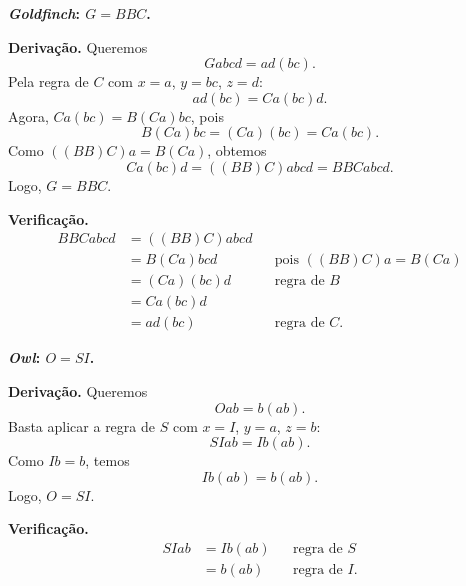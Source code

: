 \begin{solution}
\begin{Qlist}
\item[(c)] \textbf{\textit{Goldfinch}: $G = BBC$.}

\textbf{Derivação.} Queremos
\[
Gabcd = ad(bc).
\]
Pela regra de \(C\) com \(x=a\), \(y=bc\), \(z=d\):
\[
ad(bc) = Ca(bc)d.
\]
Agora, \(Ca(bc) = B(Ca)bc\), pois
\[
B(Ca)bc = (Ca)(bc) = Ca(bc).
\]
Como \(((BB)C)a = B(Ca)\), obtemos
\[
Ca(bc)d = ((BB)C)abcd = BBCabcd.
\]
Logo, \(G = BBC\).

\textbf{Verificação.}
\[
\begin{aligned}
BBCabcd
&= ((BB)C)abcd \\
&= B(Ca)bcd && \text{pois } ((BB)C)a = B(Ca) \\
&= (Ca)(bc)d && \text{regra de } B \\
&= Ca(bc)d \\
&= ad(bc) && \text{regra de } C.
\end{aligned}
\]

\item[(d)] \textbf{\textit{Owl}: $O = SI$.}

\textbf{Derivação.} Queremos
\[
Oab = b(ab).
\]
Basta aplicar a regra de \(S\) com \(x=I\), \(y=a\), \(z=b\):
\[
SIab = Ib(ab).
\]
Como \(Ib = b\), temos
\[
Ib(ab) = b(ab).
\]
Logo, \(O = SI\).

\textbf{Verificação.}
\[
\begin{aligned}
SIab
&= Ib(ab) && \text{regra de } S \\
&= b(ab) && \text{regra de } I.
\end{aligned}
\]
\end{Qlist}
\end{solution}


